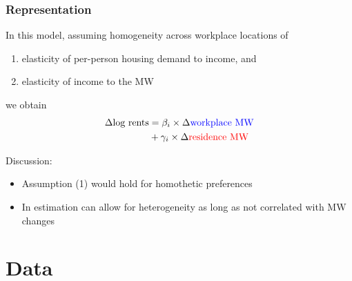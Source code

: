 \documentclass[aspectratio=169, t]{beamer}
\begin{document}
\begin{frame}
    \frametitle{Representation}

    In this model, assuming homogeneity across workplace locations of
    \begin{enumerate}
        \item elasticity of per-person housing demand to income, and
        \item elasticity of income to the MW
    \end{enumerate}
    we obtain
    \[
    \begin{split}
        \Delta \text{log rents} & = \beta_i  \times \Delta {\color{blue}  \text{workplace MW}} \\
                                & + \gamma_i \times \Delta {\color{red} \text{residence MW}} \\
    \end{split}
    \]

    \vspace{3mm}
    \pause
    Discussion:
    \begin{itemize}
        \item Assumption (1) would hold for homothetic preferences
        \item In estimation can allow for heterogeneity as long as not correlated with MW changes
    \end{itemize}

\end{frame}


\section{Data}
\end{document}
